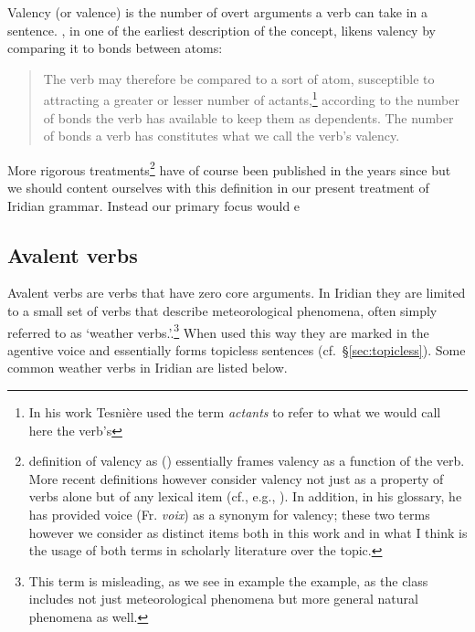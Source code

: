 Valency (or valence) is the number of overt arguments a verb can take in a sentence. \textcite[239]{tesniere1965}, in one of the earliest description of the concept, likens valency by comparing it to bonds between atoms:
\begin{quotation}
	\small
The verb may therefore be compared to a sort of atom, susceptible to attracting a greater or lesser number of actants,\footnote{In his work Tesni\`ere used the term \emph{actants} to refer to what we would call here the verb's } according to the number of bonds the verb has available to keep them as dependents. The number of bonds a verb has constitutes what we call the verb's valency.
\end{quotation}

More rigorous treatments\footnote{ definition of valency as  () essentially frames valency as a function of the verb. More recent definitions however consider valency not just as a property of verbs alone but of any lexical item (cf., e.g., \cite{matthews1997,trask1993}). In addition, in his glossary, he has provided voice (Fr. \emph{voix}) as a synonym for valency; these two terms however we consider as distinct items both in this work and in what I think is the usage of both terms in scholarly literature over the topic.} have of course been published in the years since but we should content ourselves with this definition in our present treatment of Iridian grammar. Instead our primary focus would e

\subsection{Avalent verbs}

Avalent verbs  are verbs that have zero core arguments. In Iridian they are limited to a small set of verbs that describe meteorological phenomena, often simply referred to as `weather verbs.'.\footnote{This term is misleading, as we see in example the example, as the class includes not just meteorological phenomena but more general natural phenomena as well.} When used this way they are marked in the agentive voice and essentially forms topicless sentences (cf.~\S\ref{sec:topicless}). Some common weather verbs in Iridian are listed below.

